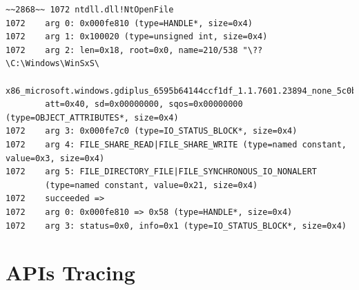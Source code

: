 \begin{lstlisting}[caption={Log entry relative to a \texttt{NtOpenFile} call},captionpos=b]
~~2868~~ 1072 ntdll.dll!NtOpenFile
1072 	arg 0: 0x000fe810 (type=HANDLE*, size=0x4)
1072 	arg 1: 0x100020 (type=unsigned int, size=0x4)
1072 	arg 2: len=0x18, root=0x0, name=210/538 "\??\C:\Windows\WinSxS\
		x86_microsoft.windows.gdiplus_6595b64144ccf1df_1.1.7601.23894_none_5c0be957a009922e", 
		att=0x40, sd=0x00000000, sqos=0x00000000 (type=OBJECT_ATTRIBUTES*, size=0x4)
1072 	arg 3: 0x000fe7c0 (type=IO_STATUS_BLOCK*, size=0x4)
1072 	arg 4: FILE_SHARE_READ|FILE_SHARE_WRITE (type=named constant, value=0x3, size=0x4)
1072 	arg 5: FILE_DIRECTORY_FILE|FILE_SYNCHRONOUS_IO_NONALERT
 		(type=named constant, value=0x21, size=0x4)
1072    succeeded =>
1072 	arg 0: 0x000fe810 => 0x58 (type=HANDLE*, size=0x4)
1072 	arg 3: status=0x0, info=0x1 (type=IO_STATUS_BLOCK*, size=0x4)
\end{lstlisting}

\section{APIs Tracing}

